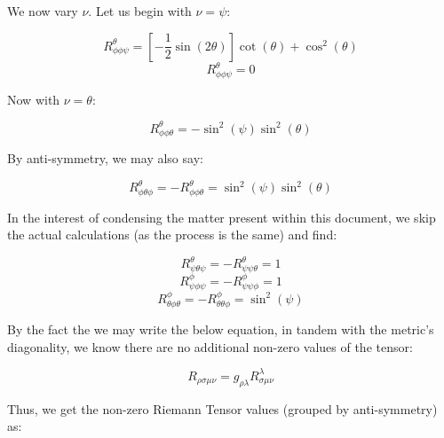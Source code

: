 \begin{enumerate}
\begin{enumerate}
        We now vary $\nu$. Let us begin with $\nu=\psi$:

        $$R^{\theta}_{\phi\phi\psi}=\left[ -\frac{1}{2}\sin(2\theta) \right]\cot(\theta)+\cos^2(\theta)$$
        $$R^{\theta}_{\phi\phi\psi}=0$$

        Now with $\nu=\theta$:

        $$R^{\theta}_{\phi\phi\theta}=-\sin^2(\psi)\sin^2(\theta)$$

        By anti-symmetry, we may also say:

        $$\boxed{R^{\theta}_{\phi\theta\phi}=-R^{\theta}_{\phi\phi\theta}=\sin^2(\psi)\sin^2(\theta)}$$

        In the interest of condensing the matter present within this document, we skip the actual calculations (as the process is the same) and find:

        $$R^{\theta}_{\psi\theta\psi}=-R^{\theta}_{\psi\psi\theta}=1$$
        $$R^{\phi}_{\psi\phi\psi}=-R^{\phi}_{\psi\psi\phi}=1$$
        $$R^{\phi}_{\theta\phi\theta}=-R^{\phi}_{\theta\theta\phi}=\sin^2(\psi)$$

        By the fact the we may write the below equation, in tandem with the metric's diagonality, we know there are no additional non-zero values of the tensor:

        $$R_{\rho\sigma\mu\nu}=g_{\rho\lambda}R^{\lambda}_{\sigma\mu\nu}$$

        Thus, we get the non-zero Riemann Tensor values (grouped by anti-symmetry) as:


\end{enumerate}
\end{enumerate}
